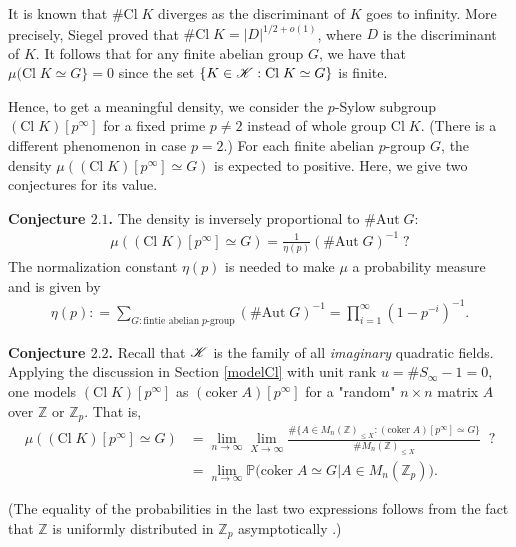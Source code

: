 \documentclass[12pt,reqno]{amsart}
\numberwithin{equation}{section}
\def\Z{{\mathbb Z}}
\def\P{{\mathbb P}}
\begin{document}
It is known that $\# \text{Cl} \; K$ diverges as the discriminant of $K$ goes to infinity. More precisely, Siegel proved that $\# \text{Cl} \; K = |D|^{1/2+o(1)}$, where $D$ is the discriminant of $K$. 
It follows that for any finite abelian group $G$, we have that $\mu(\text{Cl} \; K \simeq G \} = 0$ since the set $\{K \in {\mathscr K} : \text{Cl} \; K \simeq G\}$ is finite.

Hence, to get a meaningful density, we consider the $p$-Sylow subgroup $(\text{Cl} \; K)[p^\infty]$ for a fixed prime $p \neq 2$ instead of whole group $\text{Cl} \; K$. (There is a different phenomenon in case $p = 2$.) For each finite abelian $p$-group $G$, the density $\mu((\text{Cl} \; K)[p^\infty] \simeq G)$ is expected to positive. Here, we give two conjectures for its value.

\smallskip
{\bf Conjecture $\mathbf{2.1}$.}
The density is inversely proportional to $\# \text{Aut} \; G$:
\begin{align*}
\mu((\text{Cl} \; K)[p^\infty] \simeq G) = \frac{1}{\eta(p)} (\# \text{Aut} \; G)^{-1} \; ?
\end{align*}
The normalization constant $\eta(p)$ is needed to make $\mu$ a probability measure and is given by
\begin{align*}
\eta(p) : = \sum_{G: \text{fintie abelian} \; p \text{-group}} (\# \text{Aut} \; G)^{-1} = \prod_{i=1}^\infty (1-p^{-i})^{-1}.
\end{align*}

\smallskip

{\bf Conjecture $\mathbf{2.2}$.}
Recall that ${\mathscr K}$ is the family of all \textit{imaginary} quadratic fields.
Applying the discussion in Section \ref{modelCl} with unit rank $u = \# S_\infty -1 = 0$, one models $(\text{Cl} \; K)[p^\infty]$ as $(\text{coker} \; A)[p^\infty]$ for a "random" $n \times n$ matrix $A$ over $\Z$ or $\Z_p$. That is,
\begin{align*}
\mu((\text{Cl} \; K)[p^\infty] \simeq G) &= \lim_{n \to \infty} \lim_{X \to \infty} \frac{ \#\{A \in M_n(\Z)_{\le X} : (\text{coker} \; A)[p^\infty] \simeq G \}}{\# M_n(\Z)_{\le X}} \;\; ? \\
& = \lim_{n \to \infty} \P\big( \text{coker} \; A \simeq G | A \in M_n(\Z_p)\big).
\end{align*}

(The equality of the probabilities in the last two expressions follows from the fact that $\Z$ is uniformly distributed in $\Z_p$ asymptotically .)

\vspace{2mm}
\end{document}
